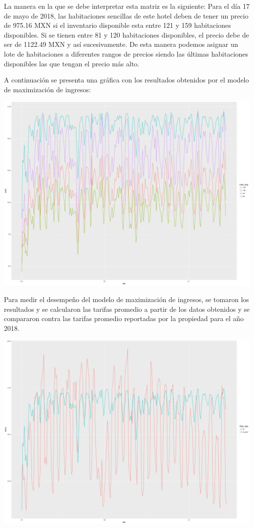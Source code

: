 La manera en la que se debe interpretar esta matriz es la siguiente: Para el día 17 de mayo de 2018, las habitaciones sencillas de este hotel deben de tener un precio de 975.16 MXN si el inventario disponible esta entre 121 y 159 habitaciones disponibles. Si se tienen entre 81 y 120 habitaciones disponibles, el precio debe de ser de 1122.49 MXN y así sucesivamente. De esta manera podemos asignar un lote de habitaciones a diferentes rangos de precios siendo las últimas habitaciones disponibles las que tengan el precio más alto.


A continuación se presenta una gráfica con los resultados obtenidos por el modelo de maximización de ingresos:

\includegraphics[width=\maxwidth]{figures/Pricing_graph-1} 

Para medir el desempeño del modelo de maximización de ingresos, se tomaron los resultados y se calcularon las tarifas promedio a partir de los datos obtenidos y se compararon contra las tarifas promedio reportadas por la propiedad para el año 2018.

\includegraphics[width=\maxwidth]{figures/Pricing-1} 


